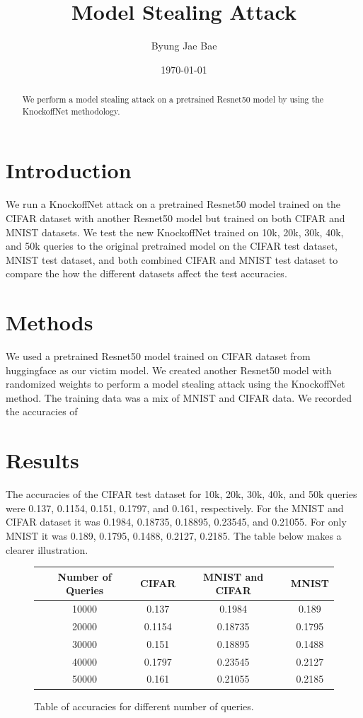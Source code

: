 \documentclass{article}
\title{Model Stealing Attack}
\author{Byung Jae Bae}
\date{\today}
\begin{document}
\maketitle

\begin{abstract}
We perform a model stealing attack on a pretrained Resnet50 model by using the KnockoffNet methodology.
\end{abstract}

\section{Introduction}
We run a KnockoffNet attack on a pretrained Resnet50 model trained on the CIFAR dataset with another Resnet50 model but trained on both 
CIFAR and MNIST datasets. We test the new KnockoffNet trained on 10k, 20k, 30k, 40k, and 50k queries to the original pretrained model on the 
CIFAR test dataset, MNIST test dataset, and both combined CIFAR and MNIST test dataset to compare the how the different datasets affect the test accuracies.

\section{Methods}
We used a pretrained Resnet50 model trained on CIFAR dataset from huggingface as our victim model.
We created another Resnet50 model with randomized weights to perform a model stealing attack using 
the KnockoffNet method. The training data was a mix of MNIST and CIFAR data. We recorded the accuracies of 

\section{Results}
The accuracies of the CIFAR test dataset for 10k, 20k, 30k, 40k, and 50k queries were 0.137, 0.1154, 0.151, 0.1797, and 0.161, respectively.
For the MNIST and CIFAR dataset it was 0.1984, 0.18735, 0.18895, 0.23545, and 0.21055.
For only MNIST it was 0.189, 0.1795, 0.1488, 0.2127, 0.2185. The table below makes a clearer illustration.

\begin{figure}
    \begin{center}
        \begin{tabular}{|c | c c c|} 
        \hline
        Number of Queries & CIFAR & MNIST and CIFAR & MNIST \\ [0.5ex] 
        \hline
        10000 & 0.137 & 0.1984 & 0.189 \\ 
        \hline
        20000 & 0.1154 & 0.18735 & 0.1795 \\
        \hline
        30000 & 0.151 & 0.18895 & 0.1488 \\
        \hline
        40000 & 0.1797 & 0.23545 & 0.2127 \\
        \hline
        50000 & 0.161 & 0.21055 & 0.2185 \\ [1ex] 
        \hline
        \end{tabular}
    \end{center}
    \caption{Table of accuracies for different number of queries.}
    \label{fig:table1}
\end{figure}
\end{document}
